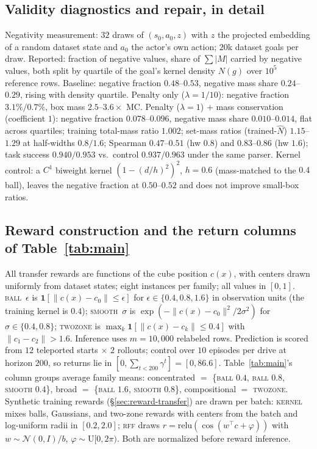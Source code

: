 \documentclass{article}
\newcommand{\ind}[1]{\mathbf{1}\!\left[#1\right]}
\newcommand{\cube}{c}
\newcommand{\Nhat}{\hat N}
\begin{document}
\subsection{Validity diagnostics and repair, in detail}
\label{app:validity}

Negativity measurement: $32$ draws of $(s_0,a_0,z)$ with $z$ the projected
embedding of a random dataset state and $a_0$ the actor's own action; $20$k
dataset goals per draw. Reported: fraction of negative values, share of
$\sum|M|$ carried by negative values, both split by quartile of the goal's
kernel density $N(g)$ over $10^5$ reference rows. Baseline: negative fraction
$0.48$--$0.53$, negative mass share $0.24$--$0.29$, rising with density
quartile. Penalty only ($\lambda{=}1/10$): negative fraction $3.1\%/0.7\%$, box
mass $2.5$--$3.6\times$ MC. Penalty ($\lambda{=}1$) $+$ mass conservation
(coefficient $1$): negative fraction $0.078$--$0.096$, negative mass share
$0.010$--$0.014$, flat across quartiles; training total-mass ratio $1.002$;
set-mass ratios (trained-$\Nhat$) $1.15$--$1.29$ at half-widths $0.8/1.6$;
Spearman $0.47$--$0.51$ (hw $0.8$) and $0.83$--$0.86$ (hw $1.6$); task success
$0.940/0.953$ vs.\ control $0.937/0.963$ under the same parser. Kernel
control: a $C^1$ biweight kernel $(1-(d/h)^2)^2$, $h=0.6$ (mass-matched to the
$0.4$ ball), leaves the negative fraction at $0.50$--$0.52$ and does not
improve small-box ratios.

\subsection{Reward construction and the return columns of Table~\ref{tab:main}}
\label{app:rewards}

All transfer rewards are functions of the cube position $\cube(x)$, with
centers drawn uniformly from dataset states; eight instances per family; all
values in $[0,1]$. \textsc{ball}~$\epsilon$ is
$\ind{\|\cube(x)-c_0\|\le\epsilon}$ for $\epsilon\in\{0.4,0.8,1.6\}$ in
observation units (the training kernel is $0.4$); \textsc{smooth}~$\sigma$ is
$\exp(-\|\cube(x)-c_0\|^2/2\sigma^2)$ for $\sigma\in\{0.4,0.8\}$;
\textsc{twozone} is $\max_k\ind{\|\cube(x)-c_k\|\le0.4}$ with
$\|c_1-c_2\|>1.6$. Inference uses $m=10{,}000$ relabeled rows. Prediction is
scored from $12$ teleported starts $\times$ $2$ rollouts; control over $10$
episodes per drive at horizon $200$, so returns lie in
$[0,\sum_{t<200}\gamma^t]=[0,86.6]$. Table~\ref{tab:main}'s column groups
average family means: concentrated $=$ \{\textsc{ball} $0.4$, \textsc{ball}
$0.8$, \textsc{smooth} $0.4$\}, broad $=$ \{\textsc{ball} $1.6$,
\textsc{smooth} $0.8$\}, compositional $=$ \textsc{twozone}. Synthetic training
rewards (\S\ref{sec:reward-transfer}) are drawn per batch: \textsc{kernel}
mixes balls, Gaussians, and two-zone rewards with centers from the batch and
log-uniform radii in $[0.2,2.0]$; \textsc{rff} draws
$r=\mathrm{relu}(\cos(w^{\top}\cube+\varphi))$ with $w\sim\mathcal{N}(0,I)/b$,
$\varphi\sim\mathrm{U}[0,2\pi)$. Both are normalized before reward inference.
\end{document}
